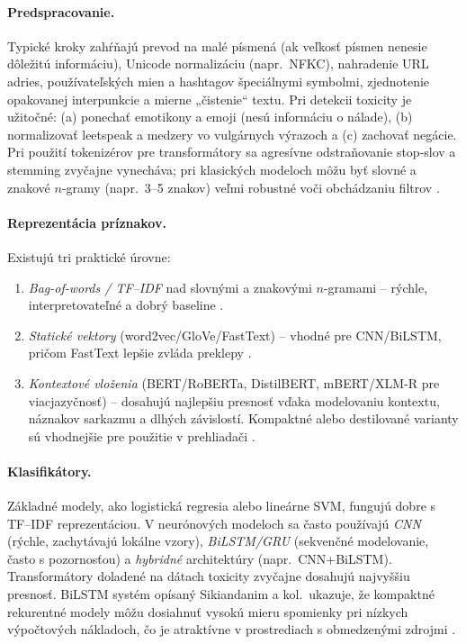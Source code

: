 \paragraph{Predspracovanie.}
Typické kroky zahŕňajú prevod na malé písmená (ak veľkosť písmen nenesie dôležitú informáciu), Unicode normalizáciu (napr.\ NFKC), nahradenie URL adries, používateľských mien a hashtagov špeciálnymi symbolmi, zjednotenie opakovanej interpunkcie a mierne „čistenie“ textu. Pri detekcii toxicity je užitočné: (a) ponechať emotikony a emoji (nesú informáciu o nálade), (b) normalizovať leetspeak a medzery vo vulgárnych výrazoch a (c) zachovať negácie. Pri použití tokenizérov pre transformátory sa agresívne odstraňovanie stop-slov a stemming zvyčajne vynecháva; pri klasických modeloch môžu byť slovné a znakové \(n\)-gramy (napr.\ 3--5 znakov) veľmi robustné voči obchádzaniu filtrov \cite{kumar2024eliminating}\cite{hatexplain2021}\cite{fasttext2017}.

\paragraph{Reprezentácia príznakov.}
Existujú tri praktické úrovne:
\begin{enumerate}
  \item \emph{Bag-of-words / TF--IDF} nad slovnými a znakovými \(n\)-gramami – rýchle, interpretovateľné a dobrý baseline \cite{davidson2017hate}\cite{kumar2024eliminating}.
  \item \emph{Statické vektory} (word2vec/GloVe/FastText) – vhodné pre CNN/BiLSTM, pričom FastText lepšie zvláda preklepy \cite{fasttext2017}\cite{word2vec2013}\cite{glove2014}.
  \item \emph{Kontextové vloženia} (BERT/RoBERTa, DistilBERT, mBERT/XLM-R pre viacjazyčnosť) – dosahujú najlepšiu presnosť vďaka modelovaniu kontextu, náznakov sarkazmu a dlhých závislostí. Kompaktné alebo destilované varianty sú vhodnejšie pre použitie v prehliadači \cite{jigsaw2018toxic}\cite{jigsaw2020multilingual}\cite{bert2019}\cite{roberta2019}\cite{toxigen2022}\cite{distilbert2019}\cite{xlmr2020}.
\end{enumerate}

\paragraph{Klasifikátory.}
Základné modely, ako logistická regresia alebo lineárne SVM, fungujú dobre s TF--IDF reprezentáciou. V neurónových modeloch sa často používajú \emph{CNN} (rýchle, zachytávajú lokálne vzory), \emph{BiLSTM/GRU} (sekvenčné modelovanie, často s pozornosťou) a \emph{hybridné} architektúry (napr.\ CNN+BiLSTM). Transformátory doladené na dátach toxicity zvyčajne dosahujú najvyššiu presnosť. BiLSTM systém opísaný Sikiandanim a kol.\ ukazuje, že kompaktné rekurentné modely môžu dosiahnuť vysokú mieru spomienky pri nízkych výpočtových nákladoch, čo je atraktívne v prostrediach s obmedzenými zdrojmi \cite{davidson2017hate}\cite{kumar2024eliminating}
\cite{sikiandani2025browser}\cite{bert2019}\cite{roberta2019}\cite{distilbert2019}.

